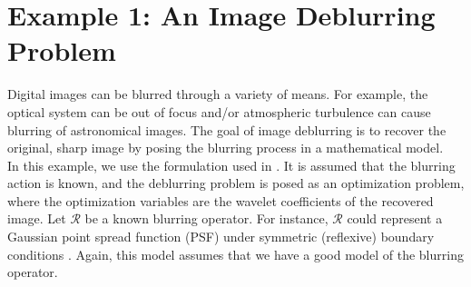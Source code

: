 \documentclass[journal]{IEEEtran}
\newcommand{\opn}[1]{\operatorname{#1}}
\begin{document}
%
%
%
%
%
%
%


\section{Example 1: An Image Deblurring Problem}
Digital images can be blurred through a variety of means.  For example, the optical system can be out of focus and/or atmospheric turbulence can cause blurring of astronomical images.  The goal of image deblurring is to recover the original, sharp image by posing the blurring process in a mathematical model.\\

In this example, we use the formulation used in \cite{beck_2009}.  It is assumed that the blurring action is known, and the deblurring problem is posed as an optimization problem, where the optimization variables are the wavelet coefficients of the recovered image.  Let $\mathcal{R}$ be a known blurring operator.  For instance, $\mathcal{R}$ could represent a Gaussian point spread function (PSF) under symmetric (reflexive) boundary conditions \cite{hansen_2006}.  Again, this model assumes that we have a good model of the blurring operator.\\
\end{document}
